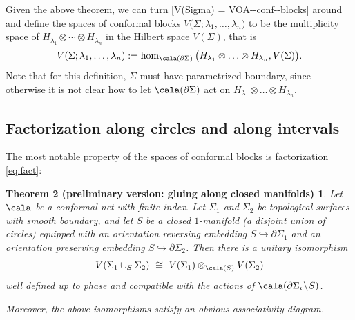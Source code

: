 \documentclass[a4paper,10pt,leqno]{amsart}
\theoremstyle{plain}
\newtheorem*{theorem3*}{Theorem 2 (preliminary version: gluing along closed manifolds)}
\theoremstyle{definition}
\theoremstyle{remark}
\DeclareRobustCommand{\SkipTocEntry}[5]{}
\begin{document}
Given the above theorem, we can turn \eqref{V(Sigma) = VOA--conf--blocks} around and define
the spaces of conformal blocks $V\big(\Sigma;\lambda_1,\ldots,\lambda_n\big)$ to be 
the multiplicity space of $H_{\lambda_1}\otimes \cdots \otimes H_{\lambda_n}$ in the Hilbert space $V(\Sigma)$, that is
\begin{equation}\label{eq: cfblk as multiplicity space}
V(\Sigma;\lambda_1,\ldots,\lambda_n):=\hom_{\cala(\partial \Sigma)} \big(H_{\lambda_1}\otimes \ldots \otimes H_{\lambda_n},V(\Sigma)\big).
\end{equation}
Note that for this definition, $\Sigma$ must have parametrized boundary, since otherwise it is not clear how to let $\cala(\partial \Sigma)$ act on $H_{\lambda_1}\otimes \ldots \otimes H_{\lambda_n}$.

\subsection*{Factorization along circles and along intervals}
The most notable property of the spaces of conformal blocks is factorization \eqref{eq:fact}:

\begin{theorem3*}
Let $\cala$ be a conformal net with finite index.
Let $\Sigma_1$ and $\Sigma_2$ be topological surfaces with smooth boundary, and
let $S$ be a closed $1$-manifold (a disjoint union of circles) equipped with an orientation reversing embedding $S\hookrightarrow \partial \Sigma_1$
and an orientation preserving embedding $S\hookrightarrow \partial \Sigma_2$.
Then there is a unitary isomorphism
\[
V(\Sigma_1\cup_S \Sigma_2) \,\,\cong\,\, V(\Sigma_1)\otimes_{\cala(S)} V(\Sigma_2)
\]
well defined up to phase and compatible with the actions of $\cala(\partial\Sigma_i\!\setminus\! S)$.

Moreover, the above isomorphisms satisfy an obvious associativity diagram.
\end{theorem3*}
\end{document}
